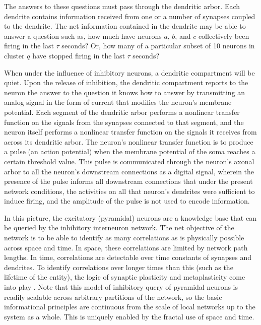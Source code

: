 \documentclass[twocolumn]{article}
\begin{document}
The answers to these questions must pass through the dendritic arbor. Each dendrite contains information received from one or a number of synapses coupled to the dendrite. The net information contained in the dendrite may be able to answer a question such as, how much have neurons $a$, $b$, and $c$ collectively been firing in the last $\tau$ seconds? Or, how many of a particular subset of 10 neurons in cluster $q$ have stopped firing in the last $\tau$ seconds? 

When under the influence of inhibitory neurons, a dendritic compartment will be quiet. Upon the release of inhibition, the dendritic compartment reports to the neuron the answer to the question it knows how to answer by transmitting an analog signal in the form of current that modifies the neuron's membrane potential. Each segment of the dendritic arbor performs a nonlinear transfer function on the signals from the synapses connected to that segment, and the neuron itself performs a nonlinear transfer function on the signals it receives from across its dendritic arbor. The neuron's nonlinear transfer function is to produce a pulse (an action potential) when the membrane potential of the soma reaches a certain threshold value. This pulse is communicated through the neuron's axonal arbor to all the neuron's downstream connections as a digital signal, wherein the presence of the pulse informs all downstream connections that under the present network conditions, the activities on all that neuron's dendrites were sufficient to induce firing, and the amplitude of the pulse is not used to encode information.

In this picture, the excitatory (pyramidal) neurons are a knowledge base that can be queried by the inhibitory interneuron network. The net objective of the network is to be able to identify as many correlations as is physically possible across space and time. In space, these correlations are limited by network path lengths. In time, correlations are detectable over time constants of synapses and dendrites. To identify correlations over longer times than this (such as the lifetime of the entity), the logic of synaptic plasticity and metaplasticity come into play \cite{fudr2005,fuab2007}. Note that this model of inhibitory query of pyramidal neurons is readily scalable across arbitrary partitions of the network, so the basic informational principles are continuous from the scale of local networks up to the system as a whole. This is uniquely enabled by the fractal use of space and time.
\end{document}
